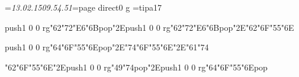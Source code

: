 \footline={\tenrm\it 13.02.15\hfill\folio\hfill09.54.51}\chardef\match=\pdfcolorstackinit page direct{0 g} \font\ipa=tipa17 \pdfpagewidth 5.5in \pdfpageheight 8.5in \hsize 4.5in \vsize 7in \hoffset -0.5in \voffset -0.375in
\null\vfill
\centerline{\pdfcolorstack\match push{1 0 0 rg}\ipa\char"62\ipa\char"72\ipa\char"E6\ipa\char"6B\pdfcolorstack\match pop{}\ipa\char"2E\pdfcolorstack\match push{1 0 0 rg}\ipa\char"62\ipa\char"72\ipa\char"E6\ipa\char"6B\pdfcolorstack\match pop{}\ipa\char"2E\ipa\char"62\ipa\char"6F\ipa\char"55\ipa\char"6E}
\vfill\eject
\null\vfill
\centerline{\pdfcolorstack\match push{1 0 0 rg}\ipa\char"64\ipa\char"6F\ipa\char"55\ipa\char"6E\pdfcolorstack\match pop{}\ipa\char"2E\ipa\char"74\ipa\char"6F\ipa\char"55\ipa\char"6E\ipa\char"2E\ipa\char"61\ipa\char"74}
\vfill\eject
\null\vfill
\centerline{\ipa\char"62\ipa\char"6F\ipa\char"55\ipa\char"6E\ipa\char"2E\pdfcolorstack\match push{1 0 0 rg}\ipa\char"49\ipa\char"74\pdfcolorstack\match pop{}\ipa\char"2E\pdfcolorstack\match push{1 0 0 rg}\ipa\char"64\ipa\char"6F\ipa\char"55\ipa\char"6E\pdfcolorstack\match pop{}}
\vfill\eject
\bye